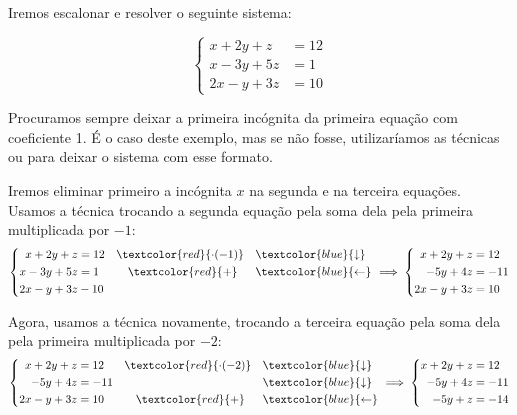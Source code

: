 \begin{example}{}
Iremos escalonar e resolver o seguinte sistema:

\begin{equation*}
\left \{
\begin{aligned}
x+2y+z&=12\\
x-3y+5z&=1\\
2x-y+3z&=10
\end{aligned}
\right.
\end{equation*}

Procuramos sempre deixar a primeira incógnita da primeira equação com coeficiente 1. É o caso deste exemplo, mas se não fosse, utilizaríamos as técnicas  ou  para deixar o sistema com esse formato.

Iremos eliminar primeiro a incógnita $x$ na segunda e na terceira equações. Usamos a técnica  trocando a segunda equação pela soma dela pela primeira multiplicada por $-1$:
\begin{equation*}
\left \{
\begin{aligned}
x+2y+z&=12 &&\textcolor{red}{\cdot(-1)} &&\vspace{1ex}\textcolor{blue}{\downarrow}\\
x-3y+5z&=1 &&\quad\textcolor{red}{+}  &&\textcolor{blue}{\leftarrow}\\
2x-y+3z&-10
\end{aligned}
\right.
\implies
\left \{
\begin{aligned}
x+2y+z&=12\\
-5y+4z&=-11\\
2x-y+3z&=10
\end{aligned}
\right.
\end{equation*}

Agora, usamos a técnica  novamente, trocando a terceira equação pela soma dela pela primeira multiplicada por $-2$:
\begin{equation*}
\left \{
\begin{aligned}
x+2y+z&=12 &&\textcolor{red}{\cdot(-2)} &&\vspace{1ex}\textcolor{blue}{\downarrow}\\
-5y+4z&=-11 &&&&\vspace{1ex}\textcolor{blue}{\downarrow}\\
2x-y+3z&=10 &&\quad\textcolor{red}{+}  &&\textcolor{blue}{\leftarrow}
\end{aligned}
\right.
\implies
\left \{
\begin{aligned}
x+2y+z&=12\\
-5y+4z&=-11\\
-5y+z&=-14
\end{aligned}
\right.
\end{equation*}


\end{example}
